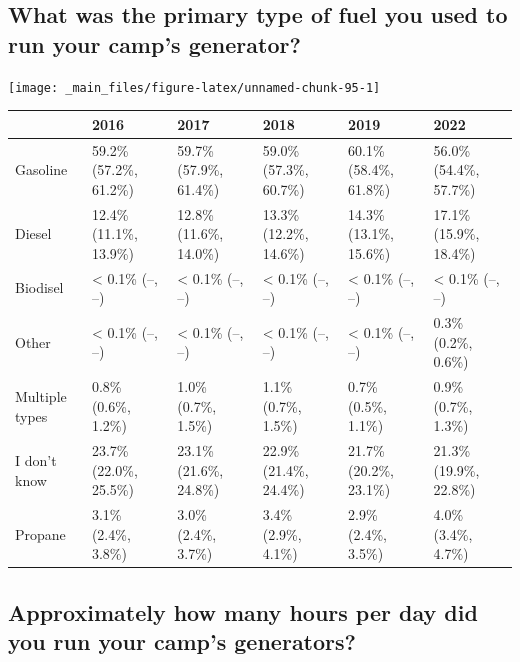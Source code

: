 \documentclass[
]{book}
\begin{document}
\hypertarget{what-was-the-primary-type-of-fuel-you-used-to-run-your-camps-generator}{%
\subsection{What was the primary type of fuel you used to run your camp's generator?}\label{what-was-the-primary-type-of-fuel-you-used-to-run-your-camps-generator}}

\texttt{[image: \_main\_files/figure-latex/unnamed-chunk-95-1]}

\begin{table}
\centering
\begin{tabular}[t]{>{}l|>{}l|>{}l|>{}l|>{}l|>{}l}
\hline
  & 2016 & 2017 & 2018 & 2019 & 2022\\
\hline
Gasoline & 59.2\% (57.2\%, 61.2\%) & 59.7\% (57.9\%, 61.4\%) & 59.0\% (57.3\%, 60.7\%) & 60.1\% (58.4\%, 61.8\%) & 56.0\% (54.4\%, 57.7\%)\\
\hline
Diesel & 12.4\% (11.1\%, 13.9\%) & 12.8\% (11.6\%, 14.0\%) & 13.3\% (12.2\%, 14.6\%) & 14.3\% (13.1\%, 15.6\%) & 17.1\% (15.9\%, 18.4\%)\\
\hline
Biodisel & < 0.1\% (--, --) & < 0.1\% (--, --) & < 0.1\% (--, --) & < 0.1\% (--, --) & < 0.1\% (--, --)\\
\hline
Other & < 0.1\% (--, --) & < 0.1\% (--, --) & < 0.1\% (--, --) & < 0.1\% (--, --) & 0.3\% (0.2\%, 0.6\%)\\
\hline
Multiple types & 0.8\% (0.6\%, 1.2\%) & 1.0\% (0.7\%, 1.5\%) & 1.1\% (0.7\%, 1.5\%) & 0.7\% (0.5\%, 1.1\%) & 0.9\% (0.7\%, 1.3\%)\\
\hline
I don't know & 23.7\% (22.0\%, 25.5\%) & 23.1\% (21.6\%, 24.8\%) & 22.9\% (21.4\%, 24.4\%) & 21.7\% (20.2\%, 23.1\%) & 21.3\% (19.9\%, 22.8\%)\\
\hline
Propane & 3.1\% (2.4\%, 3.8\%) & 3.0\% (2.4\%, 3.7\%) & 3.4\% (2.9\%, 4.1\%) & 2.9\% (2.4\%, 3.5\%) & 4.0\% (3.4\%, 4.7\%)\\
\hline
\end{tabular}
\end{table}

\hypertarget{approximately-how-many-hours-per-day-did-you-run-your-camps-generators}{%
\subsection{Approximately how many hours per day did you run your camp's generators?}\label{approximately-how-many-hours-per-day-did-you-run-your-camps-generators}}
\end{document}
